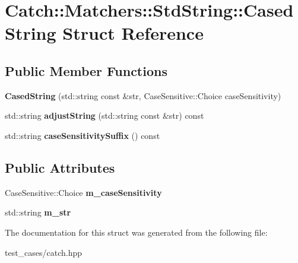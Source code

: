 \hypertarget{structCatch_1_1Matchers_1_1StdString_1_1CasedString}{}\section{Catch\+:\+:Matchers\+:\+:Std\+String\+:\+:Cased\+String Struct Reference}
\label{structCatch_1_1Matchers_1_1StdString_1_1CasedString}
\subsection*{Public Member Functions}
\begin{DoxyCompactItemize}
\item 
\mbox{\label{structCatch_1_1Matchers_1_1StdString_1_1CasedString_aa88bbc5acd2bff22351d8d4b1816b561}} 
{\bfseries Cased\+String} (std\+::string const \&str, Case\+Sensitive\+::\+Choice case\+Sensitivity)
\item 
\mbox{\label{structCatch_1_1Matchers_1_1StdString_1_1CasedString_a77639b1165c01f424ee0e96f53335010}} 
std\+::string {\bfseries adjust\+String} (std\+::string const \&str) const
\item 
\mbox{\label{structCatch_1_1Matchers_1_1StdString_1_1CasedString_a9759155344d696b2476d764a1d95fcc9}} 
std\+::string {\bfseries case\+Sensitivity\+Suffix} () const
\end{DoxyCompactItemize}
\subsection*{Public Attributes}
\begin{DoxyCompactItemize}
\item 
\mbox{\label{structCatch_1_1Matchers_1_1StdString_1_1CasedString_ae1c2864c986941536a6e94cca0528f92}} 
Case\+Sensitive\+::\+Choice {\bfseries m\+\_\+case\+Sensitivity}
\item 
\mbox{\label{structCatch_1_1Matchers_1_1StdString_1_1CasedString_ad05dbc99aba3c3c386d6b856b213f911}} 
std\+::string {\bfseries m\+\_\+str}
\end{DoxyCompactItemize}


The documentation for this struct was generated from the following file\+:\begin{DoxyCompactItemize}
\item 
test\+\_\+cases/catch.\+hpp\end{DoxyCompactItemize}
